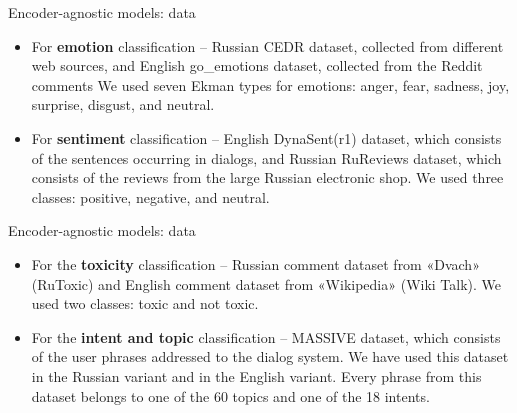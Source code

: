 \begin{frame}{Encoder-agnostic models: data }
\begin{itemize}
    \item For \textbf{emotion} classification -- Russian CEDR dataset, collected from different web sources, and English go\_emotions dataset, collected from the Reddit comments
We used seven Ekman types for emotions: anger, fear, sadness, joy, surprise, disgust, and neutral. 
    \item For \textbf{sentiment}  classification -- English DynaSent(r1) dataset, which consists of the sentences occurring in dialogs, and Russian RuReviews dataset, which consists of the reviews from the large Russian electronic shop. We used three classes: positive, negative, and neutral. 
\end{itemize}
\end{frame}

\begin{frame}{Encoder-agnostic models: data}
\begin{itemize}
    \item For the \textbf{toxicity} classification -- Russian comment dataset from «Dvach» (RuToxic) and English comment dataset from  «Wikipedia» (Wiki Talk). We used two classes: toxic and not toxic.
    \item For the \textbf{intent and topic} classification -- MASSIVE dataset, which consists of the user phrases addressed to the dialog system. We have used this dataset in the Russian variant and in the English variant. Every phrase from this dataset belongs to one of the 60 topics and one of the 18 intents. 
\end{itemize}
\end{frame}



